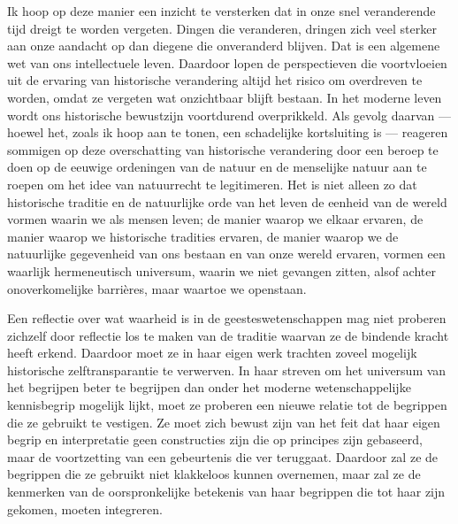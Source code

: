 Ik hoop op deze manier een inzicht te versterken dat in onze snel veranderende tijd dreigt te worden vergeten. Dingen die veranderen, dringen zich veel sterker aan onze aandacht op dan diegene die onveranderd blijven. Dat is een algemene wet van ons intellectuele leven. Daardoor lopen de perspectieven die voortvloeien uit de ervaring van historische verandering altijd het risico om overdreven te worden, omdat ze vergeten wat onzichtbaar blijft bestaan. In het moderne leven wordt ons historische bewustzijn voortdurend overprikkeld. Als gevolg daarvan — hoewel het, zoals ik hoop aan te tonen, een schadelijke kortsluiting is — reageren sommigen op deze overschatting van historische verandering door een beroep te doen op de eeuwige ordeningen van de natuur en de menselijke natuur aan te roepen om het idee van natuurrecht te legitimeren. Het is niet alleen zo dat historische traditie en de natuurlijke orde van het leven de eenheid van de wereld vormen waarin we als mensen leven; de manier waarop we elkaar ervaren, de manier waarop we historische tradities ervaren, de manier waarop we de natuurlijke gegevenheid van ons bestaan en van onze wereld ervaren, vormen een waarlijk hermeneutisch universum, waarin we niet gevangen zitten, alsof achter onoverkomelijke barrières, maar waartoe we openstaan.

Een reflectie over wat waarheid is in de geesteswetenschappen mag niet proberen zichzelf door reflectie los te maken van de traditie waarvan ze de bindende kracht heeft erkend. Daardoor moet ze in haar eigen werk trachten zoveel mogelijk historische zelftransparantie te verwerven. In haar streven om het universum van het begrijpen beter te begrijpen dan onder het moderne wetenschappelijke kennisbegrip mogelijk lijkt, moet ze proberen een nieuwe relatie tot de begrippen die ze gebruikt te vestigen. Ze moet zich bewust zijn van het feit dat haar eigen begrip en interpretatie geen constructies zijn die op principes zijn gebaseerd, maar de voortzetting van een gebeurtenis die ver teruggaat. Daardoor zal ze de begrippen die ze gebruikt niet klakkeloos kunnen overnemen, maar zal ze de kenmerken van de oorspronkelijke betekenis van haar begrippen die tot haar zijn gekomen, moeten integreren.


